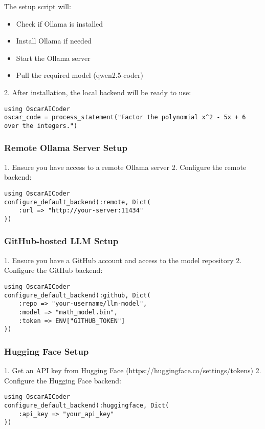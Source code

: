 \documentclass[11pt,a4paper]{article}
\begin{document}
The setup script will:
\begin{itemize}
    \item Check if Ollama is installed
    \item Install Ollama if needed
    \item Start the Ollama server
    \item Pull the required model (qwen2.5-coder)
\end{itemize}

2. After installation, the local backend will be ready to use:
\begin{lstlisting}
using OscarAICoder
oscar_code = process_statement("Factor the polynomial x^2 - 5x + 6 over the integers.")
\end{lstlisting}

\subsubsection{Remote Ollama Server Setup}

1. Ensure you have access to a remote Ollama server
2. Configure the remote backend:
\begin{lstlisting}
using OscarAICoder
configure_default_backend(:remote, Dict(
    :url => "http://your-server:11434"
))
\end{lstlisting}

\subsubsection{GitHub-hosted LLM Setup}

1. Ensure you have a GitHub account and access to the model repository
2. Configure the GitHub backend:
\begin{lstlisting}
using OscarAICoder
configure_default_backend(:github, Dict(
    :repo => "your-username/llm-model",
    :model => "math_model.bin",
    :token => ENV["GITHUB_TOKEN"]
))
\end{lstlisting}

\subsubsection{Hugging Face Setup}

1. Get an API key from Hugging Face (https://huggingface.co/settings/tokens)
2. Configure the Hugging Face backend:
\begin{lstlisting}
using OscarAICoder
configure_default_backend(:huggingface, Dict(
    :api_key => "your_api_key"
))
\end{lstlisting}
\end{document}
